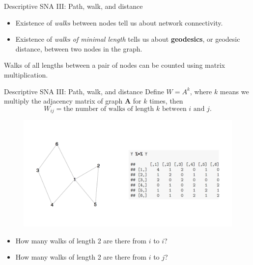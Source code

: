 \documentclass[10pt]{beamer}
\begin{document}
\begin{frame}{Descriptive SNA III: Path, walk, and distance}
\begin{itemize}
	\item Existence of \textit{walks} between nodes tell us about network connectivity.
	
	\item Existence of \textit{walks of minimal length} tells us about \textbf{geodesics}, or geodesic distance, between two nodes in the graph.
\end{itemize}

Walks of all lengths between a pair of nodes can be counted using matrix multiplication.
\end{frame}

\begin{frame}{Descriptive SNA III: Path, walk, and distance}
Define $W = A^k$, where $k$ means we multiply the adjacency matrix of graph \textbf{A} for $k$ times, then 
	\begin{equation}
	W_{ij} = \text{the number of walks of length $k$ between $i$ and $j$.}	
	\end{equation}
\end{frame}

\begin{frame}
	\begin{figure}
	\centering
	\includegraphics[scale=0.4]{Figs/path}
	\end{figure}
	\vspace{0.1cm}
	
	\begin{itemize}
	\item How many walks of length 2 are there from $i$ to $i$?
	\item How many walks of length 2 are there from $i$ to $j$?
	\end{itemize}
\end{frame}
\end{document}
